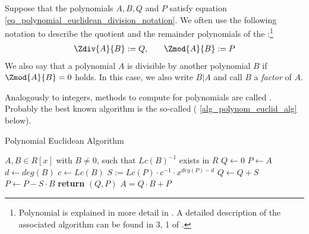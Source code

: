 \begin{notation}
\label{notation_polynomial_euclidean_division_notation}
Suppose that the polynomials $ A, B, Q $ and $ P $ satisfy equation \ref{eq_polynomial_euclidean_division_notation}. We often use the following notation to describe the quotient and the remainder polynomials of the :\footnote{Polynomial  is explained in more detail in \cite{mignotte-1992}. A detailed description of the associated algorithm can be found in \chaptname{} 3, \secname{} 1 of \cite{cohen-2010}. }
\begin{equation}
\label{def_polynomial_division_and_modulus}
\begin{array}{lcr}
\Zdiv{A}{B}: = Q, & & \Zmod{A}{B}: = P
\end{array}
\end{equation}
We also say that a polynomial $ A $ is divisible by another polynomial $ B $ if $ \Zmod{A}{B} = 0 $ holds. In this case, we also write $ B | A $ and call $B$ a \textit{factor} of $A$.
\end{notation}
Analogously to integers, methods to compute  for polynomials are called . Probably the best known algorithm is the so-called  (\algname{} \ref{alg_polynom_euclid_alg} below).
\begin{algorithm}\caption{Polynomial Euclidean Algorithm}
\label{alg_polynom_euclid_alg}
\begin{algorithmic}[0]
\Require $A,B \in R[x]$ with $B\neq 0$, such that $Lc(B)^{-1}$ exists in $R$
\State $Q \gets 0$
\State $P \gets A$
\State $d \gets deg(B)$
\State $c \gets Lc(B)$
\State  $S := Lc(P)\cdot c^{-1}\cdot x^{deg(P)-d}$
\State $Q \gets Q + S$
\State $P \gets P - S\cdot B$
\EndWhile
\State \textbf{return} $(Q, P)$
\EndProcedure
\Ensure $ A=  Q \cdot B + P$
\end{algorithmic}
\end{algorithm}

